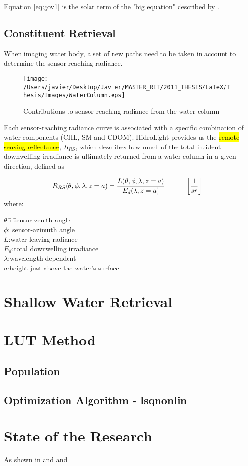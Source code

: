 Equation \eqref{eq:gov1} is the solar term of the "big equation" described by \cite{Schott}.

\subsection{Constituent Retrieval}

When imaging water body, a set of new paths need to be taken in account to determine the sensor-reaching radiance.
 \begin{figure}[H]
	\centering
    	\texttt{[image: /Users/javier/Desktop/Javier/MASTER\_RIT/2011\_THESIS/LaTeX/Thesis/Images/WaterColumn.eps]}
 	\caption{Contributions to sensor-reaching radiance from the water column \label{fig:WaterColumn}}
  \end{figure}


Each sensor-reaching radiance curve is associated with a specific combination of water components (CHL, SM and CDOM). HidroLight provides us the \hl{remote sensing reflectance}, $R_{RS}$, which describes how much of the total incident downwelling irradiance is ultimately returned from a water column in a given direction, defined as

\begin{equation} \label{eq:Rrs}
R_{RS}(\theta,\phi,\lambda,z=a) = \frac{L(\theta,\phi,\lambda,z=a)}{E_d(\lambda,z=a)}   \indent   \indent  \left[\frac{1}{sr}\right]  
\end{equation} 
where:
\begin{tabbing}
\indent \indent \indent  $\theta$ \hspace{1.5mm}\=:  \indent \= sensor-zenith angle\\
\indent \indent \indent  $\phi$\>: \>sensor-azimuth angle\\
\indent \indent \indent $L$\>:\>water-leaving radiance\\
\indent \indent \indent $E_d$\>:\>total downwelling irradiance\\
\indent \indent \indent $\lambda$\>:\>wavelength dependent\\
\indent \indent \indent $a$\>:\>height just above the water's surface\\
\end{tabbing}



\section{Shallow Water Retrieval}
\section{LUT Method}
\subsection{Population}
\subsection{Optimization Algorithm  - lsqnonlin}

\section{State of the Research}

As shown in \cite{GeraceThesis}
and \cite{Mobley} and \cite{Lesser}